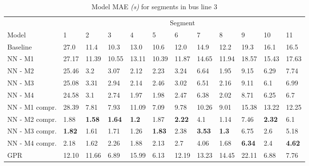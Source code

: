 \begin{table}[H]
  \centering
  \caption{Model MAE \textit{(s)} for segments in bus line 3}
  \label{tbl:model-mae-of-segs-203}
  \begin{adjustbox}{center}
	\begin{tabular}{l|l|l|l|l|l|l|l|l|l|l|l}
		& \multicolumn{11}{c}{Segment}                                                                                                                                                  \\
Model          & 1             & 2             & 3             & 4            & 5             & 6             & 7             & 8            & 9             & 10            & 11              \\ 
\hline
Baseline       & 27.0          & 11.4          & 10.3          & 13.0         & 10.6          & 12.0          & 14.9          & 12.2         & 19.3          & 16.1          & 16.5            \\
NN - M1        & 27.17         & 11.39         & 10.55         & 13.11        & 10.39         & 11.87         & 14.65         & 11.94        & 18.57         & 15.43         & 17.63           \\
NN - M2        & 25.46         & 3.2           & 3.07          & 2.12         & 2.23          & 3.24          & 6.64          & 1.95         & 9.15          & 6.29          & 7.74            \\
NN - M3        & 25.08         & 3.31          & 2.94          & 2.14         & 2.46          & 3.02          & 6.51          & 2.16         & 9.11          & 6.1           & 6.99            \\
NN - M4        & 24.58         & 3.1           & 2.74          & 1.97         & 1.98          & 2.47          & 6.38          & 2.02         & 8.71          & 6.25          & 6.7             \\
NN - M1 compr. & 28.39         & 7.81          & 7.93          & 11.09        & 7.09          & 9.78          & 10.26         & 9.01         & 15.38         & 13.22         & 12.25           \\
NN - M2 compr. & 1.88          & \textbf{1.58}         & \textbf{1.64} & \textbf{1.2} & 1.87          & \textbf{2.22} & 4.1           & 1.14         & 7.46          & \textbf{2.32} & 6.1             \\
NN - M3 compr. & \textbf{1.82} & 1.61 & 1.71          & 1.26         & \textbf{1.83} & 2.38          & \textbf{3.53} & \textbf{1.3} & 6.75          & 2.6           & 5.18            \\
NN - M4 compr. & 2.18          & 1.62          & 2.26          & 1.88         & 2.13          & 2.7           & 4.06          & 1.68         & \textbf{6.34} & 2.4           & \textbf{4.62 }  \\
GPR            & 12.10         & 11.66         & 6.89          & 15.99        & 6.13          & 12.19         & 13.23         & 14.45        & 22.11         & 6.88          & 7.76           
\end{tabular}

  \end{adjustbox}
\end{table}

